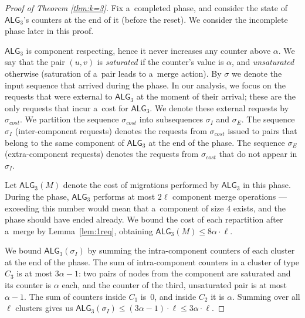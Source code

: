 \documentclass[a4paper,anonymous,USenglish]{lipics-v2019}
\newcommand{\TAlg}{{\ensuremath{\textsf{ALG}_{3}}}\xspace}
\begin{document}
\begin{proof}[Proof of Theorem \ref{thm:k=3}]
	Fix a~completed phase, and consider the state of \TAlg's counters at the end of it (before the reset).
	We consider the incomplete phase later in this proof.
	
	\TAlg is component respecting, hence it never increases any counter above $\alpha$.
	We say that the pair $(u, v)$ is \emph{saturated} if the counter's value is $\alpha$, and \emph{unsaturated} otherwise (saturation of a~pair leads to a~merge action).
	By $\sigma$ we denote the input sequence that arrived during the phase.
	In our analysis, we focus on the requests that were external to \TAlg at the moment of their arrival; these are the only requests that incur a~cost for \TAlg.
	We denote these external requests by $\sigma_{cost}$.
	We partition the sequence $\sigma_{cost}$ into subsequences $\sigma_I$ and $\sigma_E$.
	The sequence $\sigma_I$ (inter-component requests) denotes the requests from $\sigma_{cost}$ issued to pairs that belong to the same component of \TAlg at the end of the phase.
	The sequence $\sigma_E$ (extra-component requests) denotes the requests from $\sigma_{cost}$ that do not appear in $\sigma_I$.
	
	
	Let $\TAlg(M)$ denote the cost of migrations performed by \TAlg in this phase.
	During the phase, \TAlg performs at most $2 \ell$ component merge operations ---
	exceeding this number would mean that a~component of size $4$ exists, and the phase should have ended already.
	We bound the cost of each repartition after a~merge by Lemma~\ref{lem:1req}, obtaining $\TAlg(M) \leq 8\alpha\cdot\ell$.
	
	We bound $\TAlg(\sigma_I)$ by summing the intra-component counters of each cluster at the end of the phase.
	The sum of intra-component counters in a cluster of type $C_3$ is at most $3 \alpha - 1$: two pairs of nodes from the component are saturated and its counter is $\alpha$ each, and the counter of the third, unsaturated pair is at most $\alpha-1$.
	The sum of counters inside $C_1$ is~$0$, and inside $C_2$ it is $\alpha$.
	Summing over all $\ell$ clusters gives us $\TAlg(\sigma_I) \leq (3 \alpha-1)\cdot \ell \leq 3\alpha\cdot\ell$.
	

\end{proof}
\end{document}

